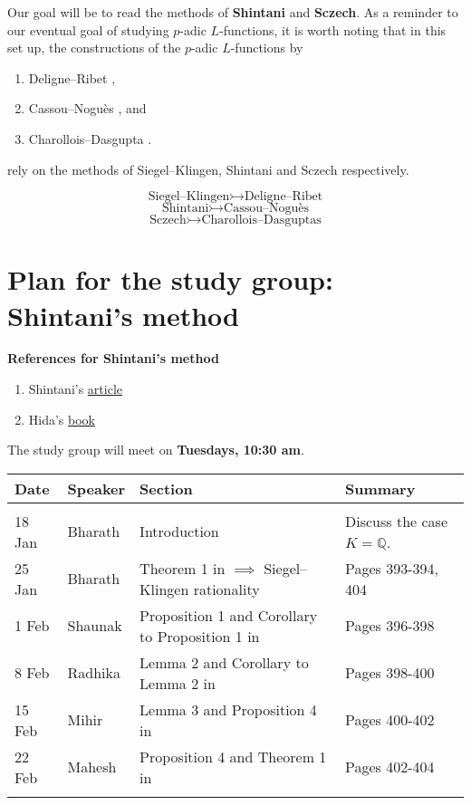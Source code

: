\documentclass[11pt,a4paper,notitlepage]{article}
\begin{document}
Our goal will be to read the methods of \textbf{Shintani} and \textbf{Sczech}. As a reminder to our eventual goal of studying $p$-adic $L$-functions, it is worth noting that in this set up, the  constructions of the $p$-adic $L$-functions by 
\begin{enumerate}
\item Deligne--Ribet \cite{MR579702},
\item Cassou--Nogu\`es \cite{MR522119,MR524276}, and
\item Charollois--Dasgupta \cite{MR3272012}.
\end{enumerate}

rely on the methods of Siegel--Klingen, Shintani and Sczech respectively. 

\[\text{Siegel--Klingen} \rightarrowtail \text{Deligne--Ribet}\]
\[\text{Shintani} \rightarrowtail \text{Cassou--Nogu\`es}\]
\[\text{Sczech} \rightarrowtail \text{Charollois--Dasguptas}\]






\section{Plan for the study group: Shintani's method}
\textbf{References for Shintani's method}
\begin{enumerate}
\item Shintani's \href{shintani-evaluation.pdf}{article} \cite{MR427231}	
\item Hida's \href{hida-elementary.pdf}{book} 	\cite{MR1216135}
\end{enumerate}
The study group will meet on \textbf{Tuesdays, 10:30 am}.
\begin{center}
\begin{tabularx}{\textwidth}{p{5cm}p{5cm}p{5cm}p{5cm}}
\toprule  
Date & Speaker & Section  & Summary  \\ 
\midrule \\
18 Jan & Bharath & Introduction  & Discuss the case $K=\mathbb{Q}$. \\
25 Jan & Bharath & Theorem 1 in \cite{MR427231}  $\implies$ Siegel--Klingen rationality & Pages 393-394, 404 \\
1 Feb & Shaunak & Proposition 1 and Corollary to Proposition 1 in \cite{MR427231} & Pages 396-398 \\
8 Feb & Radhika & Lemma 2 and Corollary to Lemma 2 in \cite{MR427231}	& Pages 398-400 \\
15 Feb & Mihir  & Lemma 3 and Proposition 4	 in \cite{MR427231} & Pages 400-402 \\
22 Feb & Mahesh & Proposition 4 and Theorem 1 in  \cite{MR427231} & Pages 402-404 \\
\bottomrule \\
\end{tabularx}
\end{center}
	
\end{document}
